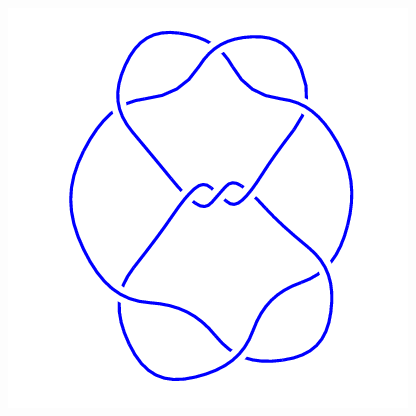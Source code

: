 \begin{figure}[H]
\begin{minipage}[b]{.18\linewidth}
    \end{minipage}
    \begin{minipage}[b]{.18\linewidth}
        \centering
        \includegraphics[width=\linewidth]{../data/9_35.png}
    \end{minipage}
\end{figure}
